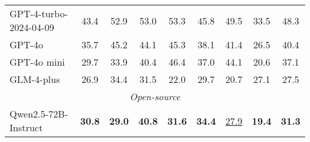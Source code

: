 \begin{table*}[!t]
{\begin{tabular}{l|ccccccc|c}
\multicolumn{1}{l|}{GPT-4-turbo-2024-04-09} & 43.4\hspace{3.5mm} & 52.9\hspace{3.5mm} & 53.0\hspace{3.5mm} & 53.3\hspace{3.5mm} & 45.8\hspace{3.5mm} & 49.5\hspace{3.5mm} & 33.5\hspace{3.5mm} & 48.3 \\
\multicolumn{1}{l|}{GPT-4o} & 35.7\hspace{3.5mm} & 45.2\hspace{3.5mm} & 44.1\hspace{3.5mm} & 45.3\hspace{3.5mm} & 38.1\hspace{3.5mm} & 41.4\hspace{3.5mm} & 26.5\hspace{3.5mm} & 40.4 \\
\multicolumn{1}{l|}{GPT-4o mini} & 29.7\hspace{3.5mm} & 33.9\hspace{3.5mm} & 40.4\hspace{3.5mm} & 46.4\hspace{3.5mm} & 37.0\hspace{3.5mm} & 44.1\hspace{3.5mm} & 20.6\hspace{3.5mm} & 37.1 \\
\multicolumn{1}{l|}{GLM-4-plus} & 26.9\hspace{3.5mm} & 34.4\hspace{3.5mm} & 31.5\hspace{3.5mm} & 22.0\hspace{3.5mm} & 29.7\hspace{3.5mm} & 20.7\hspace{3.5mm} & 27.1\hspace{3.5mm} & 27.5 \\ \midrule
\multicolumn{9}{c}{\textit{Open-source}} \\ \midrule
\multicolumn{1}{l|}{Qwen2.5-72B-Instruct} & \textbf{30.8}\hspace{3.5mm} & \textbf{29.0}\hspace{3.5mm} & \textbf{40.8}\hspace{3.5mm} & \textbf{31.6}\hspace{3.5mm} & \textbf{34.4}\hspace{3.5mm} & \underline{27.9}\hspace{3.5mm} & \textbf{19.4}\hspace{3.5mm} & \textbf{31.3} \\

\end{tabular}}
\end{table*}
